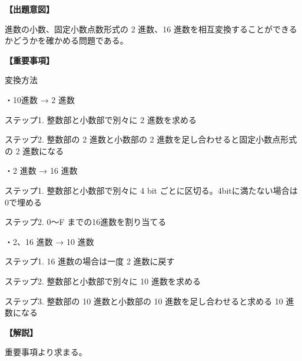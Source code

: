 \noindent \textbf{【出題意図】}

 進数の小数、固定小数点数形式の 2 進数、16 進数を相互変換することができるかどうかを確かめる問題である。

\vspace{1em}
\noindent \textbf{【重要事項】}

\noindent 変換方法

\medskip
\noindent ・10進数 → 2 進数

\medskip
\noindent ステップ1. 整数部と小数部で別々に 2 進数を求める 

\noindent ステップ2. 整数部の 2 進数と小数部の 2 進数を足し合わせると固定小数点形式の 2 進数になる 

\medskip
\noindent ・2 進数 → 16 進数

\medskip
\noindent ステップ1. 整数部と小数部で別々に 4 bit ごとに区切る。4bitに満たない場合は0で埋める

\noindent ステップ2. 0〜F までの16進数を割り当てる


\medskip
\noindent ・2、16 進数 → 10 進数

\medskip
\noindent ステップ1. 16 進数の場合は一度 2 進数に戻す

\noindent ステップ2. 整数部と小数部で別々に 10 進数を求める 

\noindent ステップ3. 整数部の 10 進数と小数部の 10 進数を足し合わせると求める 10 進数になる 


\vspace{1em}
\noindent \textbf{【解説】}

\noindent 重要事項より求まる。
